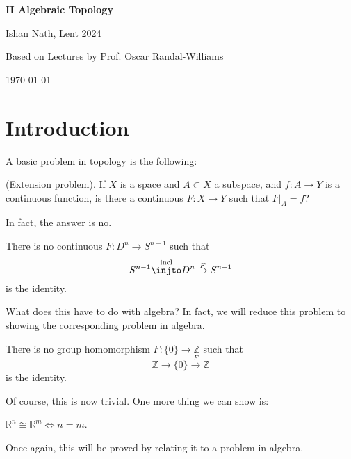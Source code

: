 \documentclass[12pt]{article}
\begin{document}
\hypersetup{pageanchor=false}
\begin{titlepage}
	\begin{center}
		\vspace*{1em}
		\Huge
		\textbf{II Algebraic Topology}

		\vspace{1em}
		\large
		Ishan Nath, Lent 2024

		\vspace{1.5em}

		\Large

		Based on Lectures by Prof. Oscar Randal-Williams

		\vspace{1em}

		\large
		\today
	\end{center}
	
\end{titlepage}
\hypersetup{pageanchor=true}

\tableofcontents

\newpage

\setcounter{section}{-1}

\section{Introduction}
\label{sec:intro}

A basic problem in topology is the following:

(Extension problem). If $X$ is a space and $A \subset X$ a subspace, and $f : A \to Y$ is a continuous function, is there a continuous $F : X \to Y$ such that $F|_A = f$?

In fact, the answer is no.

\begin{theorem}
	There is no continuous $F : D^n \to S^{n-1}$ such that
	\[
		S^{n-1} \overset{\text{incl}}{\injto} D^n \overset{F}{\to} S^{n-1}
	\]
	is the identity.
\end{theorem}

What does this have to do with algebra? In fact, we will reduce this problem to showing the corresponding problem in algebra.

\begin{theorem}
	There is no group homomorphism $F : \{0\} \to \mathbb{Z}$ such that
	\[
		\mathbb{Z} \to \{0\} \overset{F}{\to} \mathbb{Z}
	\]
	is the identity.
\end{theorem}

Of course, this is now trivial. One more thing we can show is:
\begin{theorem}
	$\mathbb{R}^n \cong \mathbb{R}^m \iff n = m$.
\end{theorem}
Once again, this will be proved by relating it to a problem in algebra.
\end{document}
